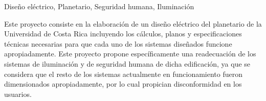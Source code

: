 
\begin{resumen}{Diseño eléctrico, Planetario, Seguridad humana, Iluminación}

Este proyecto consiste en la elaboración de un diseño eléctrico del planetario de la Universidad de Costa Rica incluyendo los cálculos, planos y especificaciones técnicas necesarias para que cada uno de los sistemas diseñados funcione apropiadamente. Este proyecto propone específicamente una readecuación de los sistemas de iluminación y de seguridad humana de dicha edificación, ya que se considera que el resto de los sistemas actualmente en funcionamiento fueron dimensionados apropiadamente, por lo cual propician disconformidad en los usuarios. 

\end{resumen}